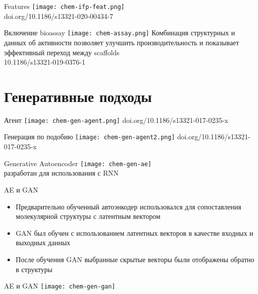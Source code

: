 \begin{frame}{Features}
    \centering
    \texttt{[image: chem-ifp-feat.png]}\\
    \footnotesize doi.org/10.1186/s13321-020-00434-7
\end{frame}


\begin{frame}{Включение bioassay}
    \texttt{[image: chem-assay.png]}
    Комбинация структурных и данных об активности позволяет улучшить производительность и показывает эффективный переход между scaffolds \\
    \footnotesize 10.1186/s13321-019-0376-1
\end{frame}

\section{Генеративные подходы}


\begin{frame}{Агент}
    \texttt{[image: chem-gen-agent.png]}
    doi.org/10.1186/s13321-017-0235-x
\end{frame}
\begin{frame}{Генерация по подобию}
    \texttt{[image: chem-gen-agent2.png]}
    doi.org/10.1186/s13321-017-0235-x
\end{frame}

\begin{frame}{ Generative Autoencoder}
    \texttt{[image: chem-gen-ae]}\\
    разработан для использования с RNN
\end{frame}

\begin{frame}{AE и GAN}
    \begin{itemize}
        \item Предварительно обученный автоэнкодер использовался для сопоставления молекулярной структуры с латентным вектором
        \item GAN был обучен с использованием латентных векторов в качестве входных и выходных данных 
        \item После обучения GAN выбранные скрытые векторы были отображены обратно в структуры  
    \end{itemize}
\end{frame}
\begin{frame}{AE и GAN}
    \centering
    \texttt{[image: chem-gen-gan]}
\end{frame}

